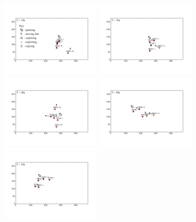 \documentclass[12pt,letterpaper]{article}
\begin{document}
\begin{figure}
\centering
  \includegraphics[width=0.45\textwidth,trim=2.5cm 3cm 2cm 3cm,clip]{./figures/pos0274}
  \includegraphics[width=0.45\textwidth,trim=2.5cm 3cm 2cm 3cm,clip]{./figures/pos0285}
  \includegraphics[width=0.45\textwidth,trim=2.5cm 3cm 2cm 3cm,clip]{./figures/pos0323}
  \includegraphics[width=0.45\textwidth,trim=2.5cm 3cm 2cm 3cm,clip]{./figures/pos0394} %
  \includegraphics[width=0.45\textwidth,trim=2.5cm 3cm 2cm 3cm,clip]{./figures/pos0435}

\end{figure}
\end{document}
